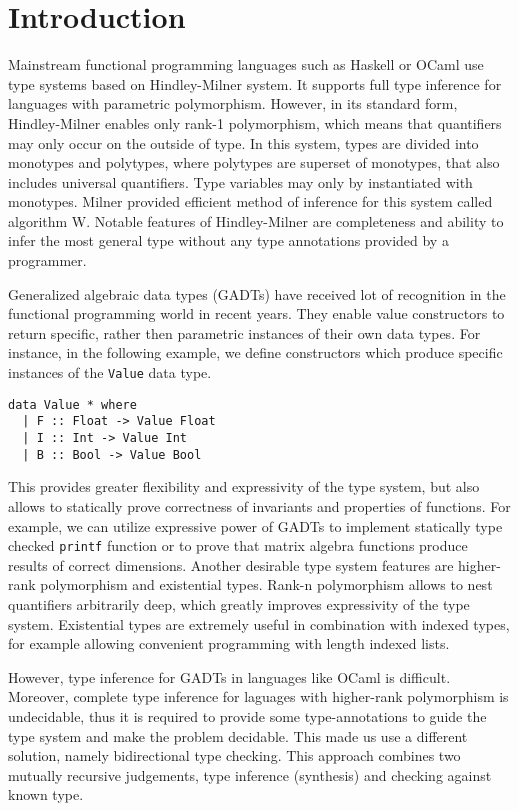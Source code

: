 \documentclass[declaration,shortabstract,english]{iithesis}
\author         {Konrad Werbliński}
\begin{document}

\chapter{Introduction}
Mainstream functional programming languages such as Haskell or OCaml use type systems
based on Hindley-Milner\cite{Hindley,Milner} system.
It supports full type inference for languages with parametric polymorphism.
However, in its standard form, Hindley-Milner enables only rank-1 polymorphism, which means that quantifiers may only
occur on the outside of type. In this system, types are divided into monotypes and polytypes,
where polytypes are superset of monotypes, that also includes universal quantifiers.
Type variables may only by instantiated with monotypes. Milner provided efficient
method of inference for this system called algorithm W\cite{Milner}.
Notable features of Hindley-Milner are completeness and ability to infer the most general type
without any type annotations provided by a programmer.

Generalized algebraic data types (GADTs)\cite{grd,fcpt} have received lot of recognition in
the functional programming world in recent years. They enable value constructors to return specific, rather
then parametric instances of their own data types. For instance, in the following example, we define
constructors which produce specific instances of the \verb+Value+ data type.
\begin{verbatim}
data Value * where
  | F :: Float -> Value Float
  | I :: Int -> Value Int
  | B :: Bool -> Value Bool
\end{verbatim}
This provides greater flexibility and expressivity of the type system,
but also allows to statically prove correctness of invariants and properties of functions.
For example, we can utilize expressive power of GADTs to implement statically type checked \verb+printf+ function
or to prove that matrix algebra functions produce results of correct dimensions. Another desirable type system
features are higher-rank polymorphism and existential types. Rank-n polymorphism allows to nest quantifiers
arbitrarily deep, which greatly improves expressivity of the type system. Existential types are extremely useful
in combination with indexed types, for example allowing convenient programming with length indexed lists.

However, type inference for GADTs in languages like OCaml is difficult\cite{ocaml-gadts}.
Moreover, complete type inference for laguages with higher-rank polymorphism is undecidable, thus it is required to
provide some type-annotations to guide the type system and make the problem decidable. This made us use a different solution,
namely bidirectional type checking\cite{PierceTurnerBidType}. This approach combines two mutually recursive judgements,
type inference (synthesis) and checking against known type.
\end{document}

